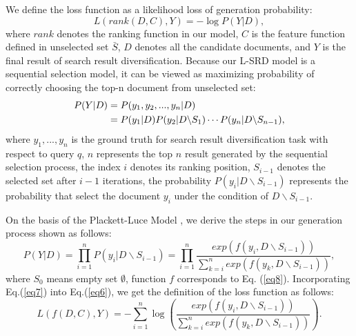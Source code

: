 \documentclass[review]{elsarticle}
\begin{document}
We define the loss function as a likelihood loss of generation probability:
\begin{equation}
	L(rank(D, C), Y)=-\log P(Y|D),
	\label{eq6}
\end{equation}
where $rank$ denotes the ranking function in our model, $C$ is the feature function defined in unselected set $\bar{S}$, $D$ denotes all the candidate documents, and $Y$ is the final result of search result diversification. Because our L-SRD model is a sequential selection model, it can be viewed as maximizing probability of correctly choosing the top-n document from unselected set:
\begin{align}
	P(Y|D)&=P(y_1,y_2,...,y_n|D) \notag \\
		   &=P(y_1|D)P(y_2|D\backslash S_1)\cdots P(y_n|D\backslash S_{n-1}),
\end{align}
where $y_1,...,y_n$ is the ground truth for search result diversification task with respect to query $q$, $n$ represents the top $n$ result generated by the sequential selection process, the index $i$ denotes its ranking position, $S_{i-1}$ denotes the selected set after $i-1$ iterations, the probability $P(y_i|D\backslash S_{i-1})$ represents the probability that select the document $y_i$ under the condition of $D\backslash S_{i-1}$.

On the basis of the Plackett-Luce Model \cite{marden1996analyzing}, we derive the steps in our generation process shown as follows:
\begin{equation}
P(Y|D)=\prod_{i=1}^nP(y_i|D\backslash S_{i-1})=\prod_{i=1}^n\frac{exp(f(y_i, D\backslash S_{i-1}))}{\sum_{k=i}^nexp(f(y_k, D\backslash S_{i-1}))},
	\label{eq7}
\end{equation}
where $S_0$ means empty set $\emptyset$, function $f$ corresponds to Eq. (\ref{eq8}). Incorporating Eq.(\ref{eq7}) into Eq.(\ref{eq6}), we get the definition of the loss function as follows:
\begin{equation}
	L(f(D, C), Y)=-\sum_{i=1}^n\log(\frac{exp(f(y_i, D\backslash S_{i-1}))}{\sum_{k=i}^nexp(f(y_k, D\backslash S_{i-1}))}).
\end{equation}
\end{document}

